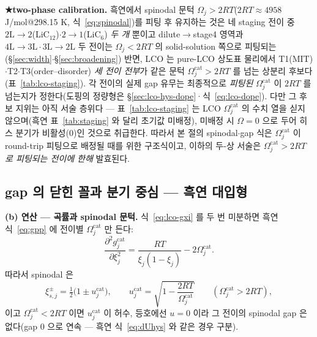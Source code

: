 \textbf{★two-phase calibration.}
흑연에서 spinodal 문턱 $\Omega_j>2RT$($2RT\approx4958$ J/mol@298.15 K, 식~\eqref{eq:spinodal})를 피팅 후
유지하는 것은 네 staging 전이 중 $2\mathrm L\!\to\!2$(LiC$_{12}$)$\cdot$$2\!\to\!1$(LiC$_6$) \emph{두 개}
뿐이고 dilute$\to$stage4 영역과 $4\mathrm L\!\to\!3\mathrm L\cdot3\mathrm L\!\to\!2\mathrm L$ 두 전이는 $\Omega_j<2RT$ 의
solid-solution 쪽으로 피팅되는(\S\ref{sec:width}$\cdot$\S\ref{sec:broadening}) 반면, LCO 는 pure-LCO
상도표 물리에서 T1(MIT)$\cdot$T2$\cdot$T3(order--disorder) \emph{세 전이 전부}가 같은 문턱
$\Omega_j^\mathrm{cat}>2RT$ 를 넘는 상분리 후보다\cite{reimers1992,vanderven1998,motohashi2009}(표~\ref{tab:lco-staging}). 각 전이의 실제 gap 유무는 최종적으로
\emph{피팅된} $\Omega_j^\mathrm{cat}$ 이 $2RT$ 를 넘는지가 정한다(도핑의 정량형은 \S\ref{sec:lco-hys-dope}·식~\eqref{eq:lco-dope}). 다만 그 후보 지위는 아직 서술
층위다 --- 표~\ref{tab:lco-staging} 는 LCO $\Omega_j^\mathrm{cat}$ 의 수치 열을 싣지 않으며(흑연
표~\ref{tab:staging} 와 달리 초기값 미배정), 미배정 시 $\Omega=0$ 으로 두어 히스 분기가 비활성(0)인
것으로 취급한다. 따라서 본 절의 spinodal$\cdot$gap 식은 $\Omega_j^\mathrm{cat}$
이 round-trip 피팅으로 배정될 때를 위한 구조식이고, 이하의 두-상 서술은 \emph{$\Omega_j^\mathrm{cat}>2RT$
로 피팅되는 전이에 한해} 발효된다.

\subsection{gap 의 닫힌 꼴과 분기 중심 --- 흑연 대입형}\label{sec:lco-hys-gap}
\textbf{(b) 연산 --- 곡률과 spinodal 문턱.}
식~\eqref{eq:lco-gxi} 를 두 번 미분하면 흑연 식~\eqref{eq:gpp} 에 전이별 $\Omega_j^\mathrm{cat}$ 만 든다:
\begin{equation}
\frac{\partial^2 g_j^\mathrm{cat}}{\partial\xi_j^2}=\frac{RT}{\xi_j(1-\xi_j)}-2\Omega_j^\mathrm{cat}.
\label{eq:lco-gpp}
\end{equation}
따라서 spinodal 은
\begin{equation}
\xi_{s,j}^{\pm}=\tfrac12\big(1\pm u_j^\mathrm{cat}\big),\qquad
u_j^\mathrm{cat}=\sqrt{1-\frac{2RT}{\Omega_j^\mathrm{cat}}}\qquad(\Omega_j^\mathrm{cat}>2RT),
\label{eq:lco-spinodal}
\end{equation}
이고 $\Omega_j^\mathrm{cat}<2RT$ 이면 $u_j^\mathrm{cat}$ 이 허수, 등호에선 $u=0$ 이라 그 전이의 spinodal gap 은 없다(gap $0$ 으로 연속 ---
흑연 식~\eqref{eq:dUhys} 와 같은 경우 구분).

